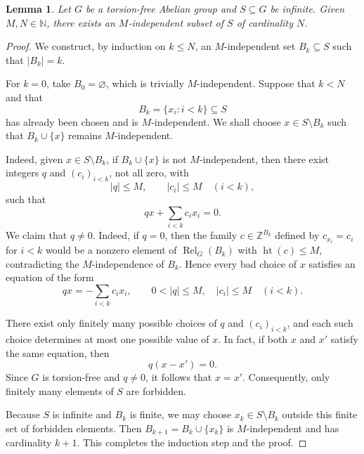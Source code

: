 \documentclass[10pt,a4paper]{amsart}
\newtheorem{lemma}[theorem]{Lemma}
\newcommand{\N}{\mathbb N}
\newcommand{\Z}{\mathbb Z}
\newcommand{\Rel}{\operatorname{Rel}}
\newcommand{\htop}{\operatorname{ht}}
\begin{document}
\begin{lemma}\label{lem:finite-extraction}
Let $G$ be a torsion-free Abelian group and $S\subseteq G$ be infinite.
Given $M,N\in\N$,
there exists an $M$-independent subset of $S$ of cardinality $N$.
\end{lemma}

\begin{proof}
We construct, by induction on $k\leq N$, an $M$-independent set
$B_k\subseteq S$ such that $|B_k|=k$.

For $k=0$, take $B_0=\varnothing$, which is trivially
$M$-independent.  Suppose that $k<N$ and that
\[
B_k=\{x_i:i<k\}\subseteq S
\]
has already been chosen and is $M$-independent. We shall choose
$x\in S\setminus B_k$ such that $B_k\cup\{x\}$ remains
$M$-independent.

Indeed, given $x\in S\setminus B_k$, if $B_k\cup\{x\}$ is not
$M$-independent, then there exist integers $q$ and $(c_i)_{i<k}$, not all
zero, with
\[
|q|\leq M,\qquad |c_i|\leq M\quad(i<k),
\]
such that
\[
qx+\sum_{i<k} c_i x_i=0.
\]
We claim that $q\neq0$. Indeed, if $q=0$, then the family
$c\in\Z^{B_k}$ defined by $c_{x_i}=c_i$ for $i<k$ would be a nonzero
element of $\Rel_G(B_k)$ with $\htop(c)\leq M$, contradicting the
$M$-independence of $B_k$. Hence every bad
choice of $x$ satisfies an equation of the form
\[
qx=-\sum_{i<k} c_i x_i,
\qquad
0<|q|\leq M,\quad |c_i|\leq M\quad(i<k).
\]

There exist only finitely many possible choices of $q$ and $(c_i)_{i<k}$,
and each such choice determines at most one possible value of $x$.
In fact, if both $x$ and $x'$ satisfy the same equation, then
\[
q(x-x')=0.
\]
Since $G$ is torsion-free and $q\neq0$, it follows that $x=x'$.
Consequently, only finitely many elements of $S$ are forbidden.

Because $S$ is infinite and $B_k$ is finite, we may choose
$x_k\in S\setminus B_k$ outside this finite set of forbidden elements.
Then $B_{k+1}=B_k\cup\{x_k\}$ is $M$-independent and has cardinality
$k+1$.  This completes the induction step and the proof.

\end{proof}
\end{document}
